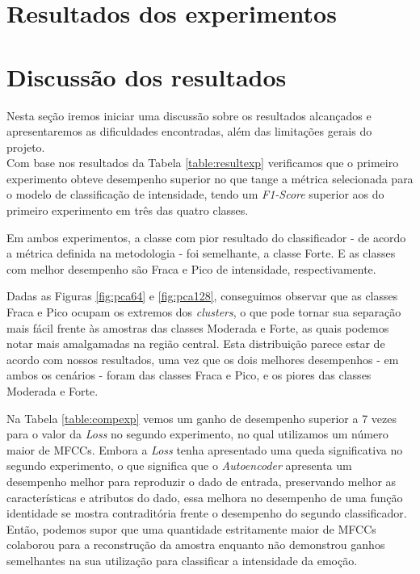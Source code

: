 {\section{Resultados dos experimentos}





\section{Discussão dos resultados}

Nesta seção iremos iniciar uma discussão sobre os resultados alcançados e apresentaremos as dificuldades encontradas, além das limitações gerais do projeto.\\

Com base nos resultados da Tabela \ref{table:resultexp} verificamos que o primeiro experimento obteve desempenho superior no que tange a métrica selecionada para o modelo de classificação de intensidade, tendo um \textit{F1-Score} superior aos do primeiro experimento em três das quatro classes.

Em ambos experimentos, a classe com pior resultado do classificador - de acordo a métrica definida na metodologia - foi semelhante, a classe Forte. E as classes com melhor desempenho são Fraca e Pico de intensidade, respectivamente.

Dadas as Figuras \ref{fig:pca64} e \ref{fig:pca128}, conseguimos observar que as classes Fraca e Pico ocupam os extremos dos \textit{clusters}, o que pode tornar sua separação mais fácil frente às amostras das classes Moderada e Forte, as quais podemos notar mais amalgamadas na região central. Esta distribuição parece estar de acordo com nossos resultados, uma vez que os dois melhores desempenhos - em ambos os cenários - foram das classes Fraca e Pico, e os piores das classes Moderada e Forte.

Na Tabela \ref{table:compexp} vemos um ganho de desempenho superior a 7 vezes para o valor da \textit{Loss} no segundo experimento, no qual utilizamos um número maior de \acrshort{MFCC}s. Embora a \textit{Loss} tenha apresentado uma queda significativa no segundo experimento, o que significa que o \textit{Autoencoder} apresenta um desempenho melhor para reproduzir o dado de entrada, preservando melhor as características e atributos do dado, essa melhora no desempenho de uma função identidade se mostra contraditória frente o desempenho do segundo classificador. Então, podemos supor que uma quantidade estritamente maior de \acrshort{MFCC}s colaborou para a reconstrução da amostra enquanto não demonstrou ganhos semelhantes na sua utilização para classificar a intensidade da emoção.

}
